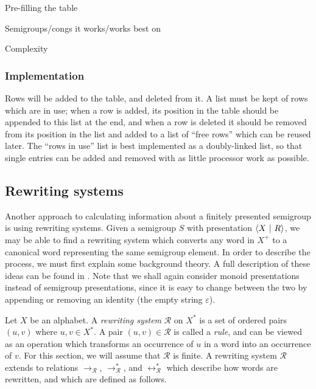 Pre-filling the table

Semigroups/congs it works/works best on

Complexity

\subsubsection{Implementation}

Rows will be added to the table, and deleted from it.  A list must be kept of
rows which are in use; when a row is added, its position in the table should be
appended to this list at the end, and when a row is deleted it should be removed
from its position in the list and added to a list of ``free rows'' which can be
reused later.  The ``rows in use'' list is best implemented as a doubly-linked
list, so that single entries can be added and removed with as little processor
work as possible.

\subsection{Rewriting systems}
\label{sec:kb}

Another approach to calculating information about a finitely presented semigroup
is using rewriting systems.  Given a semigroup $S$ with presentation
$\left\langle X ~\middle|~ R \right\rangle$, we may be able to find a rewriting system which converts any word
in $X^+$ to a canonical word representing the same semigroup element.  In order
to describe the process, we must first explain some background theory.  A full
description of these ideas can be found in \cite[Section 12.2]{cgt}.  Note that
we shall again consider monoid presentations instead of semigroup presentations,
since it is easy to change between the two by appending or removing an identity
(the empty string $\varepsilon$).

Let $X$ be an alphabet.  A \textit{rewriting system} $\mathscr{R}$ on $X^*$ is a
set of ordered pairs $(u,v)$ where $u, v \in X^*$.
A pair $(u,v) \in \mathscr{R}$ is called a \textit{rule}, and can be viewed as
an operation which transforms an occurrence of $u$ in a word into an occurrence
of $v$.
For this section, we will assume that $\mathscr{R}$ is finite.
A rewriting system $\mathscr{R}$ extends to relations
$\to_\mathscr{R}$, $\to_\mathscr{R}^*$, and $\leftrightarrow_\mathscr{R}^*$
which describe how words are rewritten, and which are defined as follows.


